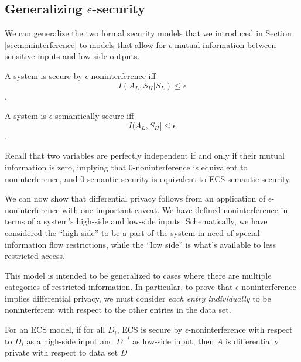 \documentclass[../thesis.tex]{subfiles}
\begin{document}
\subsection{Generalizing $\epsilon$-security}

We can generalize the two formal security models
that we introduced in Section \ref{sec:noninterference}
to models
that allow for $\epsilon$ mutual information between
sensitive inputs and low-side outputs.

\begin{dfn}
  A system is secure by $\epsilon$-noninterference iff 
  $$I(A_L, S_H \vert S_L) \leq \epsilon$$.
\end{dfn}

\begin{dfn}
  A system is $\epsilon$-semantically secure iff 
  $$I(A_L, S_H] \leq \epsilon$$.
\end{dfn}

Recall that two variables are perfectly independent
if and only if their mutual information is zero,
implying that $0$-noninterference is equivalent to
noninterference, and $0$-semantic security is equivalent
to ECS semantic security.

We can now show that differential privacy follows
from an application of $\epsilon$-noninterference
with one important caveat.
We have defined noninterference in terms of a system's
high-side and low-side inputs.
Schematically, we have considered the ``high side'' to
be a part of the system in need of special information
flow restrictions, while the ``low side'' is what's
available to less restricted access.

This model is intended to be generalized to cases where
there are multiple categories of restricted information.
In particular, to prove that $\epsilon$-noninterference
implies differential privacy, we must consider
\emph{each entry individually} to be noninterferent
with respect to the other entries in the data set.

\begin{thm}
  For an ECS model, if for all $D_i$,
  ECS is secure by $\epsilon$-noninterference with
  respect to $D_i$ as a high-side input and $D^{-i}$
  as low-side input, then $A$ is differentially
  private with respect to data set $D$
\end{thm}
\end{document}
